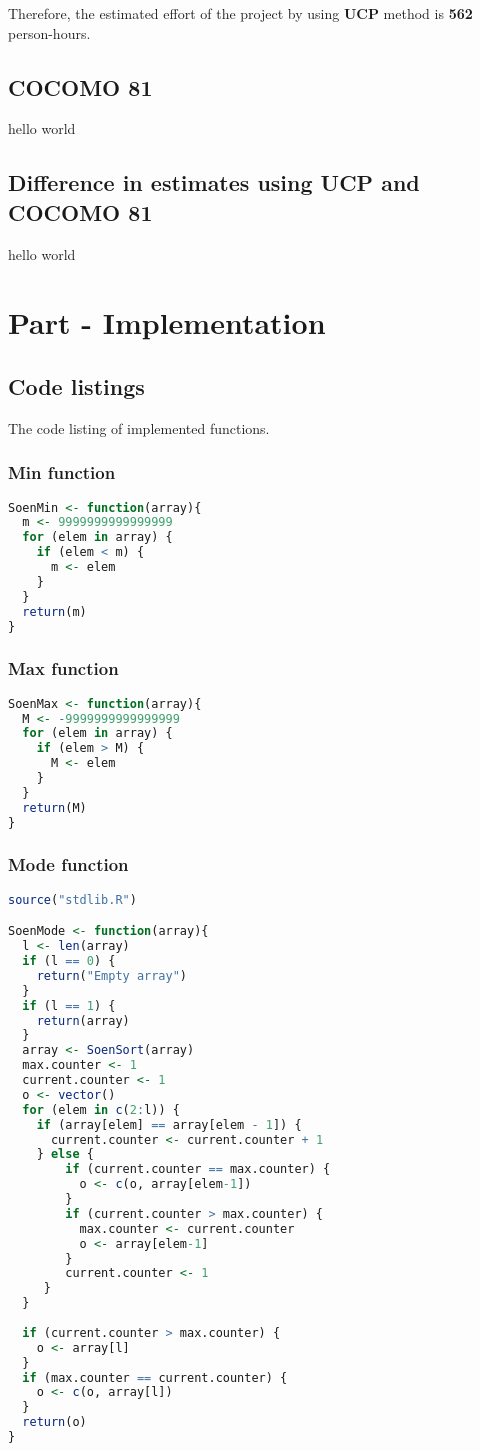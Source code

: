 \documentclass[12pt]{article}
\begin{document}
Therefore, the estimated effort of the project by using \textbf{UCP} method is \textbf{562} person-hours.

\subsection{COCOMO 81}
hello world
\subsection{Difference in estimates using UCP and COCOMO 81}
hello world

\section{Part - Implementation}
\subsection{Code listings}
The code listing of implemented functions.

\subsubsection{Min function}
\begin{lstlisting}[language=R]
SoenMin <- function(array){
  m <- 9999999999999999
  for (elem in array) {
    if (elem < m) {
      m <- elem
    }
  }
  return(m)
}
\end{lstlisting}
\subsubsection{Max function}
\begin{lstlisting}[language=R]
SoenMax <- function(array){
  M <- -9999999999999999
  for (elem in array) {
    if (elem > M) {
      M <- elem
    }
  }
  return(M)
}
\end{lstlisting}
\subsubsection{Mode function}
\begin{lstlisting}[language=R]
source("stdlib.R")

SoenMode <- function(array){
  l <- len(array)
  if (l == 0) {
    return("Empty array")
  }
  if (l == 1) {
    return(array)
  }
  array <- SoenSort(array)
  max.counter <- 1
  current.counter <- 1
  o <- vector()
  for (elem in c(2:l)) {
    if (array[elem] == array[elem - 1]) {
      current.counter <- current.counter + 1
    } else {
        if (current.counter == max.counter) {
          o <- c(o, array[elem-1])
        }
        if (current.counter > max.counter) {
          max.counter <- current.counter
          o <- array[elem-1]
        }
        current.counter <- 1
     }
  }
  
  if (current.counter > max.counter) {
    o <- array[l]
  }
  if (max.counter == current.counter) {
    o <- c(o, array[l])
  }
  return(o)
}
\end{lstlisting}
\end{document}
